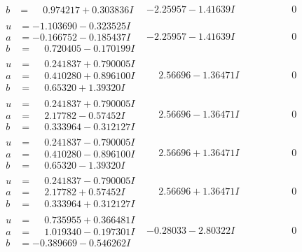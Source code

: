 \documentclass[1p]{elsarticle_modified}
\theoremstyle{definition}
\begin{document}
$$\begin{array}{c|c|c}
\begin{aligned}
b &= \phantom{-}0.974217 + 0.303836 I\end{aligned}
 & -2.25957 - 1.41639 I & \phantom{-0.000000 } 0 \\ \hline\begin{aligned}
u &= -1.103690 - 0.323525 I \\
a &= -0.166752 - 0.185437 I \\
b &= \phantom{-}0.720405 - 0.170199 I\end{aligned}
 & -2.25957 - 1.41639 I & \phantom{-0.000000 } 0 \\ \hline\begin{aligned}
u &= \phantom{-}0.241837 + 0.790005 I \\
a &= \phantom{-}0.410280 + 0.896100 I \\
b &= \phantom{-}0.65320 + 1.39320 I\end{aligned}
 & \phantom{-}2.56696 - 1.36471 I & \phantom{-0.000000 } 0 \\ \hline\begin{aligned}
u &= \phantom{-}0.241837 + 0.790005 I \\
a &= \phantom{-}2.17782 - 0.57452 I \\
b &= \phantom{-}0.333964 - 0.312127 I\end{aligned}
 & \phantom{-}2.56696 - 1.36471 I & \phantom{-0.000000 } 0 \\ \hline\begin{aligned}
u &= \phantom{-}0.241837 - 0.790005 I \\
a &= \phantom{-}0.410280 - 0.896100 I \\
b &= \phantom{-}0.65320 - 1.39320 I\end{aligned}
 & \phantom{-}2.56696 + 1.36471 I & \phantom{-0.000000 } 0 \\ \hline\begin{aligned}
u &= \phantom{-}0.241837 - 0.790005 I \\
a &= \phantom{-}2.17782 + 0.57452 I \\
b &= \phantom{-}0.333964 + 0.312127 I\end{aligned}
 & \phantom{-}2.56696 + 1.36471 I & \phantom{-0.000000 } 0 \\ \hline\begin{aligned}
u &= \phantom{-}0.735955 + 0.366481 I \\
a &= \phantom{-}1.019340 - 0.197301 I \\
b &= -0.389669 - 0.546262 I\end{aligned}
 & -0.28033 - 2.80322 I & \phantom{-0.000000 } 0 \\ \hline\begin{aligned}

\end{aligned}
\end{array}$$
\end{document}

